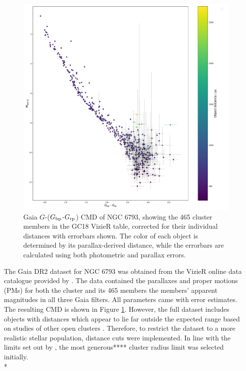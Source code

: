 \documentclass[12pt, a4paper]{report}
\begin{document}
\begin{figure}[h!]
\begin{center}
\includegraphics[width=1.0\textwidth]{../NGC_6793_CMD_observational_errorbars_vizier_465.pdf}
\caption{Gaia $G$-($G_{\textnormal{bp}}$-$G_{\textnormal{rp}}$) CMD of NGC 6793, showing the 465 cluster members in the GC18 VizieR table, corrected for their individual distances with errorbars shown. The color of each object is determined by its parallax-derived distance, while the errorbars are calculated using both photometric and parallax errors.}
\label{NGC_6793_obs_only_465}
\end{center}
\end{figure}

The Gaia DR2 dataset for NGC 6793 was obtained from the VizieR online data catalogue provided by \cite{2018A&A...616A..10G}. The data contained the parallaxes and proper motions (PMs) for both the cluster and its 465 members the members' apparent magnitudes in all three Gaia filters. All parameters came with error estimates. The resulting CMD is shown in Figure \ref{NGC_6793_obs_only_465}. However, the full dataset includes objects with distances which appear to lie far outside the expected range based on studies of other open clusters \citep{2006A&A...456..523S}. Therefore, to restrict the dataset to a more realistic stellar population, distance cuts were implemented. In line with the limits set out by \cite{2006A&A...456..523S}, the most generous**** cluster radius limit was selected initially.\\*
\end{document}
